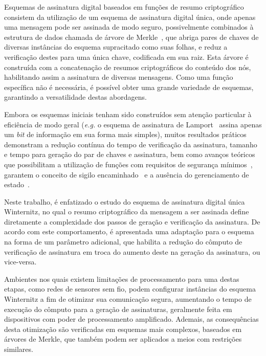 \documentclass{ufsctex/ufsctex}
\begin{document}
Esquemas de assinatura digital baseados em funções de resumo criptográfico
consistem da utilização de um esquema de assinatura digital única, onde apenas
uma mensagem pode ser assinada de modo seguro, possivelmente combinados à
estrutura de dados chamada de árvore de Merkle~\cite{Merkle:inproc:1989:aug},
que abriga pares de chaves de diversas instâncias do esquema supracitado como
suas folhas, e reduz a verificação destes para uma única chave, codificada em
sua raiz. Esta árvore é construída com a concatenação de resumos criptográficos
do conteúdo dos nós, habilitando assim a assinatura de diversas mensagens. Como
uma função específica não é necessária, é possível obter uma grande variedade
de esquemas, garantindo a versatilidade destas abordagens.

Embora os esquemas iniciais tenham sido construídos sem atenção particular à
eficiência de modo geral (\emph{e.g.} o esquema de assinatura de
Lamport~\cite{Lamport:report:1979:oct} assina apenas um \emph{bit} de
informação em sua forma mais simples), muitos resultados práticos demonstram a
redução contínua do tempo de verificação da assinatura, tamanho e tempo para
geração do par de chaves e assinatura, bem como avanços teóricos que
possibilitam a utilização de funções com requisitos de segurança
mínimos~\cite{Huelsing:inproc:2013:jun}, garantem o conceito de sigilo
encaminhado~\cite{Buchmann:inproc:2011:nov} e a ausência do gerenciamento de
estado~\cite{Bernstein:inproc:2015:apr}.

Neste trabalho, é enfatizado o estudo do esquema de assinatura digital única
Winternitz, no qual o resumo criptográfico da mensagem a ser assinada define
diretamente a complexidade dos passos de geração e verificação da assinatura.
De acordo com este comportamento, é apresentada uma adaptação para o esquema
na forma de um parâmetro adicional, que habilita a redução do cômputo de
verificação de assinatura em troca do aumento deste na geração da assinatura,
ou vice-versa.

Ambientes nos quais existem limitações de processamento para uma destas etapas,
como redes de sensores sem fio, podem configurar instâncias do esquema
Winternitz a fim de otimizar sua comunicação segura, aumentando o tempo de
execução do cômputo para a geração de assinaturas, geralmente feita em
dispositivos com poder de processamento amplificado. Ademais, as consequências
desta otimização são verificadas em esquemas mais complexos, baseados em
árvores de Merkle, que também podem ser aplicados a meios com restrições
similares.
\end{document}
